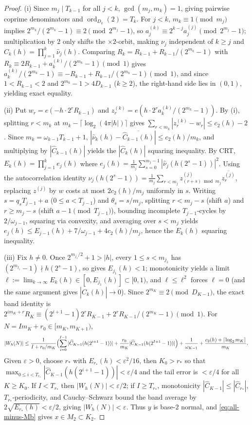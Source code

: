 \documentclass[11pt]{article}
\DeclareMathOperator{\ord}{ord}
\begin{document}
\begin{proof}
(i) Since $m_j\mid T_{k-1}$ for all $j<k$, $\gcd(m_j,m_k)=1$, giving pairwise coprime denominators and $\ord_{D_k}(2)=T_k$. For $j<k$, $m_k\equiv1\pmod{m_j}$ implies $2^{m_k}/(2^{m_k}-1)\equiv2\pmod{2^{m_j}-1}$, so $a_j^{(k)}\equiv 2^{k-j}a_j^{(j)}\pmod{2^{m_j}-1}$; multiplication by $2$ only shifts the $\times2$-orbit, making $\nu_j$ independent of $k\ge j$ and $\widehat C_k(h)=\prod_{j=1}^k\widehat\nu_j(h)$. Comparing $R_k=R_{k-1}+R_{k-1}/(2^{m_k}-1)$ with $R_k\equiv 2R_{k-1}+a_k^{(k)}/(2^{m_k}-1)\pmod1$ gives $a_k^{(k)}/(2^{m_k}-1)\equiv -R_{k-1}+R_{k-1}/(2^{m_k}-1)\pmod1$, and since $1<R_{k-1}<2$ and $2^{m_k}-1>4D_{k-1}$ ($k\ge2$), the right-hand side lies in $(0,1)$, yielding exact equality.

(ii) Put $w_r=e(-h\cdot 2^r R_{k-1})$ and $z_r^{(k)}=e(h\cdot 2^r a_k^{(k)}/(2^{m_k}-1))$. By (i), splitting $r<m_k$ at $m_k-\lceil\log_2(4\pi|h|)\rceil$ gives $\sum_{r<m_k}|z_r^{(k)}-w_r|\le c_2(h)-2$. Since $m_k=\omega_{k-1}T_{k-1}+1$, $|\widehat\nu_k(h)-\overline{\widehat C_{k-1}(h)}|\le c_2(h)/m_k$, and multiplying by $|\widehat C_{k-1}(h)|$ yields the $|\widehat C_k(h)|$ squaring inequality. By CRT, $E_k(h)=\prod_{j=1}^k e_j(h)$ where $e_j(h)=\frac1{m_j}\sum_{s=0}^{m_j-1}|\widehat\nu_j(h(2^s-1))|^2$. Using the autocorrelation identity $\widehat\nu_j(h(2^s-1))=\frac1{m_j}\sum_{r<m_j}z_{(r+s)\bmod m_j}^{(j)}\overline{z_r^{(j)}}$, replacing $z^{(j)}$ by $w$ costs at most $2c_2(h)/m_j$ uniformly in $s$. Writing $s=q_sT_{j-1}+a$ ($0\le a<T_{j-1}$) and $\theta_s=s/m_j$, splitting $r<m_j-s$ (shift $a$) and $r\ge m_j-s$ (shift $a-1\pmod{T_{j-1}}$), bounding incomplete $T_{j-1}$-cycles by $2/\omega_{j-1}$, squaring via convexity, and averaging over $s<m_j$ yields $e_j(h)\le E_{j-1}(h)+7/\omega_{j-1}+4c_2(h)/m_j$, hence the $E_k(h)$ squaring inequality.

(iii) Fix $h\neq0$. Once $2^{m_{j_1}/2}+1>|h|$, every $1\le s<m_{j_1}$ has $(2^{m_{j_1}}-1)\nmid h(2^s-1)$, so  gives $E_{j_1}(h)<1$; monotonicity yields a limit $\ell:=\lim_{k\to\infty}E_k(h)\in[0,E_{j_1}(h)]\subset[0,1)$, and $\ell\le\ell^2$ forces $\ell=0$ (and the same argument gives $|\widehat C_k(h)|\to0$). Since $2^{m_K}\equiv2\pmod{D_{K-1}}$, the exact band identity is $2^{im_K+r}R_K\equiv(2^{i+1}-1)2^rR_{K-1}+2^rR_{K-1}/(2^{m_K}-1)\pmod1$. For $N=Im_K+r_0\in[m_K,m_{K+1})$,
\[
|W_h(N)|\le\frac1{I+r_0/m_K}\Bigl(\sum_{i=0}^{I-1}|\widehat C_{K-1}(h(2^{i+1}-1))|+\frac{r_0}{m_K}|\widehat C_{K-1}(h(2^{I+1}-1))|\Bigr)+\frac1{\omega_{K-1}}+\frac{c_2(h)+\lceil\log_2 m_K\rceil}{m_K}.
\]
Given $\varepsilon>0$, choose $r_*$ with $E_{r_*}(h)<\varepsilon^2/16$, then $K_0>r_*$ so that $\max_{0\le i<T_{r_*}}|\widehat C_{K-1}(h(2^{i+1}-1))|<\varepsilon/4$ and the tail error is $<\varepsilon/4$ for all $K\ge K_0$. If $I<T_{r_*}$ then $|W_h(N)|<\varepsilon/2$; if $I\ge T_{r_*}$, monotonicity $|\widehat C_{K-1}|\le|\widehat C_{r_*}|$, $T_{r_*}$-periodicity, and Cauchy--Schwarz bound the band average by $2\sqrt{E_{r_*}(h)}<\varepsilon/2$, giving $|W_h(N)|<\varepsilon$. Thus $y$ is base-$2$ normal, and \eqref{eq:all-minus-Mb} gives $x\in M_2\subset K_2$.


\end{proof}
\end{document}
